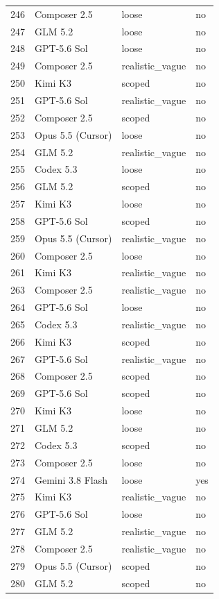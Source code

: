 \begin{tabular}{llll}
246 & Composer 2.5 & loose & no \\
247 & GLM 5.2 & loose & no \\
248 & GPT-5.6 Sol & loose & no \\
249 & Composer 2.5 & realistic\_vague & no \\
250 & Kimi K3 & scoped & no \\
251 & GPT-5.6 Sol & realistic\_vague & no \\
252 & Composer 2.5 & scoped & no \\
253 & Opus 5.5 (Cursor) & loose & no \\
254 & GLM 5.2 & realistic\_vague & no \\
255 & Codex 5.3 & loose & no \\
256 & GLM 5.2 & scoped & no \\
257 & Kimi K3 & loose & no \\
258 & GPT-5.6 Sol & scoped & no \\
259 & Opus 5.5 (Cursor) & realistic\_vague & no \\
260 & Composer 2.5 & loose & no \\
261 & Kimi K3 & realistic\_vague & no \\
263 & Composer 2.5 & realistic\_vague & no \\
264 & GPT-5.6 Sol & loose & no \\
265 & Codex 5.3 & realistic\_vague & no \\
266 & Kimi K3 & scoped & no \\
267 & GPT-5.6 Sol & realistic\_vague & no \\
268 & Composer 2.5 & scoped & no \\
269 & GPT-5.6 Sol & scoped & no \\
270 & Kimi K3 & loose & no \\
271 & GLM 5.2 & loose & no \\
272 & Codex 5.3 & scoped & no \\
273 & Composer 2.5 & loose & no \\
274 & Gemini 3.8 Flash & loose & yes \\
275 & Kimi K3 & realistic\_vague & no \\
276 & GPT-5.6 Sol & loose & no \\
277 & GLM 5.2 & realistic\_vague & no \\
278 & Composer 2.5 & realistic\_vague & no \\
279 & Opus 5.5 (Cursor) & scoped & no \\
280 & GLM 5.2 & scoped & no \\

\end{tabular}
